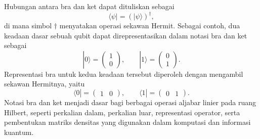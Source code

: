 Hubungan antara bra dan ket dapat dituliskan sebagai
\begin{equation}
    \langle \psi |
    =
    \left(
    |\psi\rangle
    \right)^{\dagger},
\end{equation}
di mana simbol $\dagger$ menyatakan operasi sekawan Hermit. Sebagai contoh, dua keadaan dasar sebuah qubit dapat direpresentasikan dalam notasi bra dan ket sebagai
\begin{equation}
    |0\rangle =
    \begin{pmatrix}
        1 \\
        0
    \end{pmatrix},
    \qquad
    |1\rangle =
    \begin{pmatrix}
        0 \\
        1
    \end{pmatrix}.
\end{equation}
Representasi bra untuk kedua keadaan tersebut diperoleh dengan mengambil sekawan Hermitnya, yaitu
\begin{equation}
    \langle 0| =
    \begin{pmatrix}
        1 & 0
    \end{pmatrix},
    \qquad
    \langle 1| =
    \begin{pmatrix}
        0 & 1
    \end{pmatrix}.
\end{equation}
Notasi bra dan ket menjadi dasar bagi berbagai operasi aljabar linier pada ruang Hilbert, seperti perkalian dalam, perkalian luar, representasi operator, serta pembentukan matriks densitas yang digunakan dalam komputasi dan informasi kuantum.

